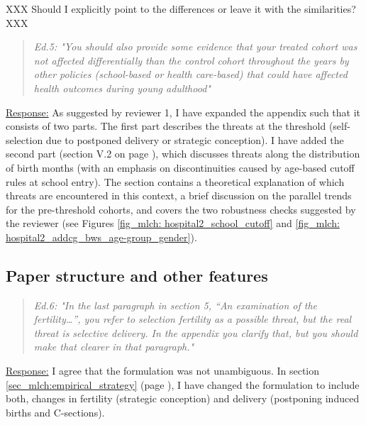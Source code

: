 {\color{red}XXX Should I explicitly point to the differences or leave it with the similarities? XXX}





\bigskip
{}
\begin{quote}
	\textit{Ed.5: "You should also provide some evidence that your treated cohort was not affected differentially than the control cohort throughout the years by other policies (school-based or health care-based) that could have affected health outcomes during young adulthood"}
\end{quote}
\underline{Response:} As suggested by reviewer 1, I have expanded the appendix such that it consists of two parts. The first part describes the threats at the threshold (self-selection due to postponed delivery or strategic conception). I have added the second part (section V.2 on page \pageref{rev_mlch:threats_birth_months}), which discusses threats along the distribution of birth months (with an emphasis on discontinuities caused by age-based cutoff rules at school entry). The section contains a theoretical explanation of which threats are encountered in this context, a brief discussion on the parallel trends for the pre-threshold cohorts, and covers the two robustness checks suggested by the reviewer (see Figures \ref{fig_mlch: hospital2_school_cutoff} and \ref{fig_mlch: hospital2_addcg_bws_age-group_gender}). 








\subsection{Paper structure and other features}


\bigskip
{}
\begin{quote}
	\textit{Ed.6: "In the last paragraph in section 5, “An examination of the fertility…”, you refer to selection fertility as a possible threat, but the real threat is selective delivery. In the appendix you clarify that, but you should make that clearer in that paragraph."}
\end{quote}
\underline{Response:}
I agree that the formulation was not unambiguous. In section \ref{sec_mlch:empirical_strategy} (page \pageref{rev_mlch: editor_selective_delivery}), I have changed the formulation to include both, changes in fertility (strategic conception) and delivery (postponing induced births and C-sections). 




